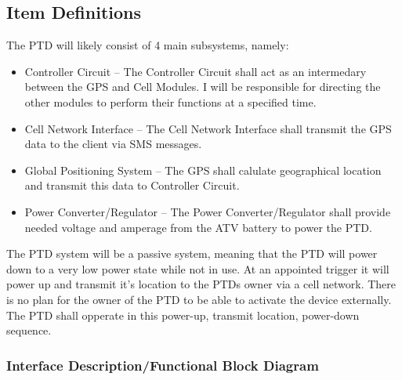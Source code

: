 \documentclass[11pt]{article}
\makeatletter
\renewcommand\paragraph{\@startsection{paragraph}{4}{\z@}%
                                     {-3.25ex\@plus -1ex \@minus -.2ex}%
                                     {0.0001pt \@plus .2ex}%
                                     {\normalfont\normalsize\bfseries}}
\makeatother
\begin{document}
\subsection{Item Definitions}
The PTD will likely consist of 4 main subsystems, namely:
\begin{itemize}
    \item Controller Circuit -- The Controller Circuit shall act as an intermedary between the GPS and Cell Modules. I will be 
        responsible for directing the other modules to perform their functions at a specified time.
    \item Cell Network Interface -- The Cell Network Interface shall transmit the GPS data to the client via SMS messages.
    \item Global Positioning System -- The GPS shall calulate geographical location and transmit this data to Controller Circuit.
    \item Power Converter/Regulator -- The Power Converter/Regulator shall provide needed voltage and amperage from the ATV battery to 
        power the PTD.
\end{itemize}
The PTD system will be a passive system, meaning that the PTD will power down to a very low power state while not in use. At an appointed 
trigger it will power up and transmit it's location to the PTDs owner via a cell network. There is no plan for the owner of the PTD to be able to 
activate the device externally. The PTD shall opperate in this power-up, transmit location, power-down sequence.

\subsubsection{Interface Description/Functional Block Diagram}



\end{document}
